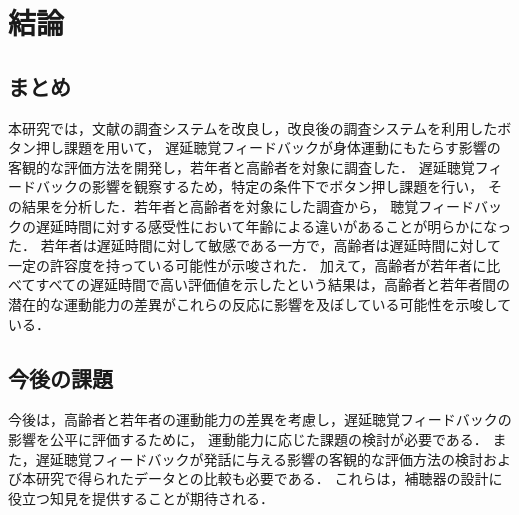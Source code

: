 \section{結論}
\subsection{まとめ}
本研究では，文献\cite{cf:shigematu}の調査システムを改良し，改良後の調査システムを利用したボタン押し課題を用いて，
遅延聴覚フィードバックが身体運動にもたらす影響の客観的な評価方法を開発し，若年者と高齢者を対象に調査した．
遅延聴覚フィードバックの影響を観察するため，特定の条件下でボタン押し課題を行い，
その結果を分析した．若年者と高齢者を対象にした調査から，
聴覚フィードバックの遅延時間に対する感受性において年齢による違いがあることが明らかになった．
若年者は遅延時間に対して敏感である一方で，高齢者は遅延時間に対して一定の許容度を持っている可能性が示唆された．
加えて，高齢者が若年者に比べてすべての遅延時間で高い評価値を示したという結果は，高齢者と若年者間の潜在的な運動能力の差異がこれらの反応に影響を及ぼしている可能性を示唆している．
\subsection{今後の課題}
今後は，高齢者と若年者の運動能力の差異を考慮し，遅延聴覚フィードバックの影響を公平に評価するために，
運動能力に応じた課題の検討が必要である．
また，遅延聴覚フィードバックが発話に与える影響の客観的な評価方法の検討および本研究で得られたデータとの比較も必要である．
これらは，補聴器の設計に役立つ知見を提供することが期待される．